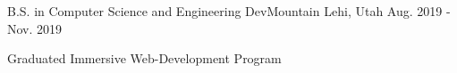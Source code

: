 

\begin{cventries}

  \cventry
    {B.S. in Computer Science and Engineering} %
    {DevMountain} %
    {Lehi, Utah} %
    {Aug. 2019 - Nov. 2019} %
    {
      \begin{cvitems} %
        \item {Graduated Immersive Web-Development Program}
      \end{cvitems}
    }

\end{cventries}
